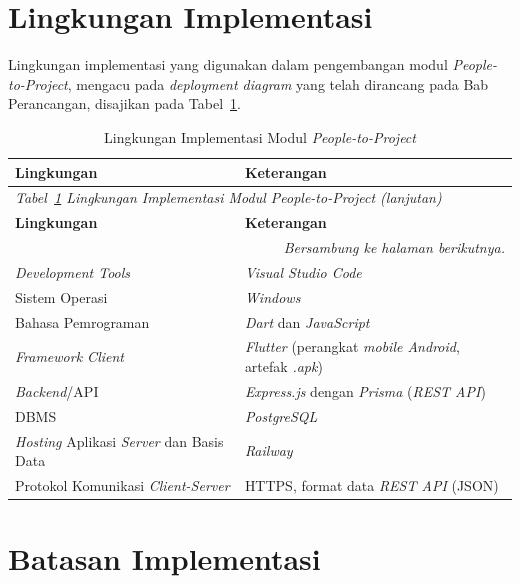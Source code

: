 \section{Lingkungan Implementasi}

Lingkungan implementasi yang digunakan dalam pengembangan modul \emph{People-to-Project}, mengacu pada \emph{deployment diagram} yang telah dirancang pada Bab Perancangan, disajikan pada Tabel~\ref{tab:lingkungan-impl}.

\begin{longtable}{p{5cm} >{\raggedright\arraybackslash}p{\dimexpr\linewidth-5cm-4\tabcolsep\relax}}
  \caption{Lingkungan Implementasi Modul \emph{People-to-Project}}
  \label{tab:lingkungan-impl} \\
  \toprule
    \textbf{Lingkungan} & \textbf{Keterangan} \\
  \midrule
  \endfirsthead
  \multicolumn{2}{l}{\small\textit{Tabel~\ref{tab:lingkungan-impl} Lingkungan Implementasi Modul \emph{People-to-Project} (lanjutan)}} \\
  \toprule
    \textbf{Lingkungan} & \textbf{Keterangan} \\
  \midrule
  \endhead
  \bottomrule
  \multicolumn{2}{r}{\textit{Bersambung ke halaman berikutnya.}} \\
  \endfoot
  \bottomrule
  \endlastfoot
    \emph{Development Tools} & \emph{Visual Studio Code} \\
    \midrule
    Sistem Operasi & \emph{Windows} \\
    \midrule
    Bahasa Pemrograman & \emph{Dart} dan \emph{JavaScript} \\
    \midrule
    \emph{Framework Client} & \emph{Flutter} (perangkat \emph{mobile Android}, artefak \emph{.apk}) \\
    \midrule
    \emph{Backend}/API & \emph{Express.js} dengan \emph{Prisma} (\emph{REST API}) \\
    \midrule
    DBMS & \emph{PostgreSQL} \\
    \midrule
    \emph{Hosting} Aplikasi \emph{Server} dan Basis Data & \emph{Railway} \\
    \midrule
    Protokol Komunikasi \emph{Client-Server} & HTTPS, format data \emph{REST API} (JSON) \\
\end{longtable}

\section{Batasan Implementasi}


